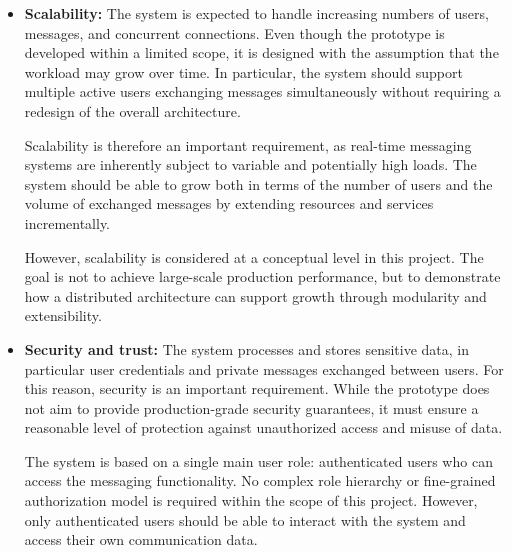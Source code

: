 \documentclass{scrartcl}
\begin{document}
\begin{itemize}
	Recovery from faults should be automatic and reasonably fast, without requiring user intervention. After a failure or disconnection, the system should restore connectivity, retrieve missing messages, and re-establish a consistent state through synchronization and reconciliation.
	
	Reliability is supported by asynchronous communication and persistent state management. Maintainability is also important: the system is structured in a modular way so that individual components can be updated, replaced, or debugged independently. Safety, understood as protection against harmful behavior in a safety-critical sense, is not a primary concern for this application domain.
	
	\item \textbf{Scalability:} The system is expected to handle increasing numbers of users, messages, and concurrent connections. Even though the prototype is developed within a limited scope, it is designed with the assumption that the workload may grow over time. In particular, the system should support multiple active users exchanging messages simultaneously without requiring a redesign of the overall architecture.
	
	Scalability is therefore an important requirement, as real-time messaging systems are inherently subject to variable and potentially high loads. The system should be able to grow both in terms of the number of users and the volume of exchanged messages by extending resources and services incrementally.
	
	However, scalability is considered at a conceptual level in this project. The goal is not to achieve large-scale production performance, but to demonstrate how a distributed architecture can support growth through modularity and extensibility.
	
	\item \textbf{Security and trust:} The system processes and stores sensitive data, in particular user credentials and private messages exchanged between users. For this reason, security is an important requirement. While the prototype does not aim to provide production-grade security guarantees, it must ensure a reasonable level of protection against unauthorized access and misuse of data.
	
	The system is based on a single main user role: authenticated users who can access the messaging functionality. No complex role hierarchy or fine-grained authorization model is required within the scope of this project. However, only authenticated users should be able to interact with the system and access their own communication data.
	

\end{itemize}
\end{document}
